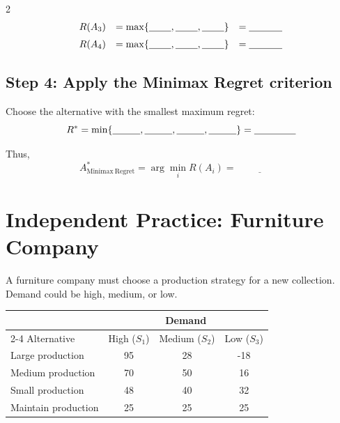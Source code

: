 \begin{multicols}{2}
\[\begin{array}{lll}
		R(A_3) &= \max\{\underline{\hspace{0.8cm}},
		\underline{\hspace{0.8cm}},
		\underline{\hspace{0.8cm}}\}
		&= \underline{\hspace{1.2cm}} \\[6pt]
		
		R(A_4) &= \max\{\underline{\hspace{0.8cm}},
		\underline{\hspace{0.8cm}},
		\underline{\hspace{0.8cm}}\}
		&= \underline{\hspace{1.2cm}}
	\end{array}
	\]
	
	\subsection*{Step 4: Apply the Minimax Regret criterion}
	
	Choose the alternative with the smallest maximum regret:
	\[
	R^*
	=
	\min\{
	\underline{\hspace{1cm}},
	\underline{\hspace{1cm}},
	\underline{\hspace{1cm}},
	\underline{\hspace{1cm}}
	\}
	=
	\underline{\hspace{1.5cm}}
	\]
	
	Thus,
	\[
	A^*_{\mathrm{Minimax\ Regret}}
	=
	\arg\min_i R(A_i)
	=
	\underline{\hspace{2cm}}
	\]
	
	\section{Independent Practice: Furniture Company}
	
	A furniture company must choose a production strategy for a new collection.
	Demand could be high, medium, or low.
	
	\begin{center}
		\renewcommand{\arraystretch}{1.3}
		\small
		\begin{tabular}{lccc}
			\toprule
			& \multicolumn{3}{c}{Demand} \\
			\cmidrule(lr){2-4}
			Alternative & High ($S_1$) & Medium ($S_2$) & Low ($S_3$) \\
			\midrule
			Large production  & 95 & 28 & -18 \\
			Medium production & 70 & 50 & 16 \\
			Small production  & 48 & 40 & 32 \\
			Maintain production & 25 & 25 & 25 \\
			\bottomrule
		\end{tabular}
	\end{center}
	

\end{multicols}
